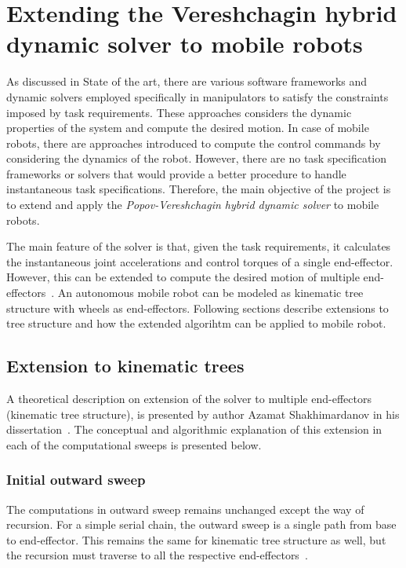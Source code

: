 
\chapter{Extending the Vereshchagin hybrid dynamic solver to mobile robots}\label{chap:extension}

As discussed in State of the art, there are various software frameworks and dynamic solvers employed specifically in manipulators to satisfy the constraints imposed by task requirements. These approaches considers the dynamic properties of the system and compute the desired motion. In case of mobile robots, there are approaches introduced to compute the control commands by considering the dynamics of the robot. However, there are no task specification frameworks or solvers that would provide a better procedure to handle instantaneous task specifications. Therefore, the main objective of the project is to 
extend and apply the \textit{Popov-Vereshchagin hybrid dynamic solver} to mobile robots. 


The main feature of the solver is that, given the task requirements, it calculates the instantaneous joint accelerations and control torques of a single end-effector. However, this can be extended to compute the desired motion of multiple end-effectors~\cite{shakhimardanov2015composable}. An autonomous mobile robot can be modeled as kinematic tree structure with wheels as end-effectors. Following sections describe extensions to tree structure and how the extended algorihtm can be applied to mobile robot.


\section{Extension to kinematic trees}

A theoretical description on extension of the solver to multiple end-effectors (kinematic tree structure), is presented by author Azamat Shakhimardanov in his dissertation~\cite{shakhimardanov2015composable}. The  conceptual and algorithmic explanation of this extension in each of the computational sweeps is presented below.

\subsection{Initial outward sweep}
The computations in outward sweep remains unchanged except the way of recursion. For a simple serial chain, the outward sweep is a single path from base to end-effector. This remains the same for kinematic tree structure as well, but the recursion must traverse to all the respective end-effectors~\cite{shakhimardanov2015composable}. 

